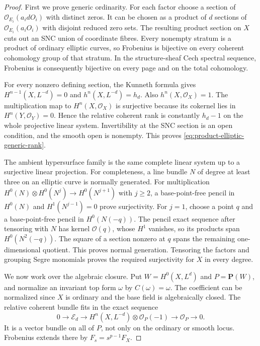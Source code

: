 \begin{proof}
First we prove generic ordinarity.  For each factor
choose a section of $\mathcal O_{E_i}(a_i dO_i)$ with
distinct zeros.  It can be chosen as a product of $d$
sections of $\mathcal O_{E_i}(a_iO_i)$ with disjoint
reduced zero sets.  The resulting product section on
$X$ cuts out an SNC union of coordinate fibres.
Every nonempty stratum is a product of ordinary elliptic
curves, so Frobenius is bijective on every coherent
cohomology group of that stratum.  In the structure-sheaf
Cech spectral sequence, Frobenius is consequently
bijective on every page and on the total cohomology.

For every nonzero defining section, the Kunneth formula
gives $H^{n-1}(X,L^{-d})=0$ and
$h^n(X,L^{-d})=h_d$.  Also $h^n(X,\mathcal O_X)=1$.
The multiplication map to $H^n(X,\mathcal O_X)$ is
surjective because its cokernel lies in
$H^n(Y,\mathcal O_Y)=0$.  Hence the relative coherent
rank is constantly $h_d-1$ on the whole projective
linear system.  Invertibility at the SNC section is
an open condition, and the smooth open is nonempty.
This proves \eqref{eq:product-elliptic-generic-rank}.

The ambient hypersurface family is the same complete
linear system up to a surjective linear projection.
For completeness, a line bundle $N$ of degree at least
three on an elliptic curve is normally generated.
For multiplication $H^0(N)\otimes H^0(N^j)\to H^0(N^{j+1})$
with $j\geq2$, a base-point-free pencil in $H^0(N)$
and $H^1(N^{j-1})=0$ prove surjectivity.
For $j=1$, choose a point $q$ and a base-point-free
pencil in $H^0(N(-q))$.  The pencil exact sequence
after tensoring with $N$ has kernel $\mathcal O(q)$,
whose $H^1$ vanishes, so its products span
$H^0(N^2(-q))$.  The square of a section nonzero at
$q$ spans the remaining one-dimensional quotient.
This proves normal generation.  Tensoring the factors
and grouping Segre monomials proves the required
surjectivity for $X$ in every degree.

We now work over the algebraic closure.  Put
$W=H^0(X,L^d)$ and $P=\mathbf P(W)$, and normalize an
invariant top form $\omega$ by $C(\omega)=\omega$.
The coefficient can be normalized since $X$ is ordinary
and the base field is algebraically closed.
The relative coherent bundle fits in the exact sequence
\begin{equation}\label{eq:product-global-bundle}
 0\longrightarrow\mathcal E_d\longrightarrow
       H^n(X,L^{-d})\otimes\mathcal O_P(-1)
       \longrightarrow\mathcal O_P\longrightarrow0.
\end{equation}
It is a vector bundle on all of $P$, not only on the
ordinary or smooth locus.  Frobenius extends there by
$F_s=s^{p-1}F_X$.


\end{proof}
